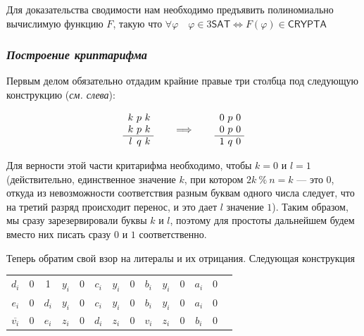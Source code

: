 \documentclass{article}
\begin{document}
Для доказательства сводимости нам необходимо предъявить полиномиально вычислимую функцию $F$, такую что $\forall \varphi \quad \varphi \in 3\mathsf{SAT} \Leftrightarrow  F(\varphi) \in \mathsf{CRYPTA}$

\subsubsection*{\textit{Построение криптарифма}}
Первым делом обязательно отдадим крайние правые три столбца под следующую конструкцию (\textit{см. слева}):

$$
  \begin{array} {c*{3}{@{\ }c}}
     k & p & k \\ 
     k & p & k \\
     \hline
     l & q & k
  \end{array}
  \qquad
  \Longrightarrow
  \qquad
  \begin{array} {c*{3}{@{\ }c}}
     0 & p & 0 \\ 
     0 & p & 0 \\
     \hline
     1 & q & 0
  \end{array}
$$

 \par Для верности этой части критарифма необходимо, чтобы $k = 0$ и $l = 1$ (действительно, единственное значение $k$, при котором $2k\ \%\ n = k$ --- это 0, откуда из невозможности соответствия разным буквам одного числа следует, что на третий разряд происходит перенос, и это дает $l$ значение $1$). Таким образом, мы сразу зарезервировали буквы $k$ и $l$, поэтому для простоты дальнейшем будем вместо них писать сразу $0$ и $1$ соответственно.

\indent Теперь обратим свой взор на литералы и их отрицания. Следующая конструкция
\newline

\begin{center}
\begin{tabular}{c*{13}{@{\ }c}}
 $d_i$ & 0 & 1 & $y_i$ & 0 & $c_i$ & $y_i$ & 0 & $b_i$ & $y_i$ & 0 & $a_i$ & 0 \\ 
$e_i$ & 0 & $d_i$ & $y_i$ & 0 & $c_i$ & $y_i$ & 0 & $b_i$ & $y_i$ & 0 & $a_i$ & 0 \\
 \hline
 $\overline{v_i}$ & 0 & $e_i$ & $z_i$ & 0 & $d_i$ & $z_i$ & 0 & $v_i$ & $z_i$ & 0 & $b_i$ & 0    
\end{tabular}
\end{center}
\end{document}
